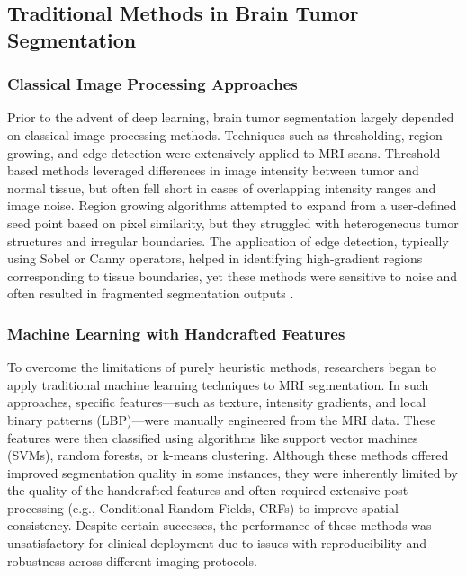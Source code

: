 \subsection{Traditional Methods in Brain Tumor Segmentation}
\label{sec:traditional_methods}

\subsubsection{Classical Image Processing Approaches}
\label{sec:classical_image_processing}
Prior to the advent of deep learning, brain tumor segmentation largely depended on classical image processing methods. Techniques such as thresholding, region growing, and edge detection were extensively applied to MRI scans. Threshold-based methods leveraged differences in image intensity between tumor and normal tissue, but often fell short in cases of overlapping intensity ranges and image noise. Region growing algorithms attempted to expand from a user-defined seed point based on pixel similarity, but they struggled with heterogeneous tumor structures and irregular boundaries. The application of edge detection, typically using Sobel \cite{sobel1968isotropic} or Canny operators, helped in identifying high-gradient regions corresponding to tissue boundaries, yet these methods were sensitive to noise and often resulted in fragmented segmentation outputs \cite{gordillo2013state}.

\subsubsection{Machine Learning with Handcrafted Features}
\label{sec:handcrafted_ml}
To overcome the limitations of purely heuristic methods, researchers began to apply traditional machine learning techniques to MRI segmentation. In such approaches, specific features—such as texture, intensity gradients, and local binary patterns (LBP)—were manually engineered from the MRI data. These features were then classified using algorithms like support vector machines (SVMs), random forests, or k-means clustering. Although these methods offered improved segmentation quality in some instances, they were inherently limited by the quality of the handcrafted features and often required extensive post-processing (e.g., Conditional Random Fields, CRFs) to improve spatial consistency. Despite certain successes, the performance of these methods was unsatisfactory for clinical deployment due to issues with reproducibility and robustness across different imaging protocols.

